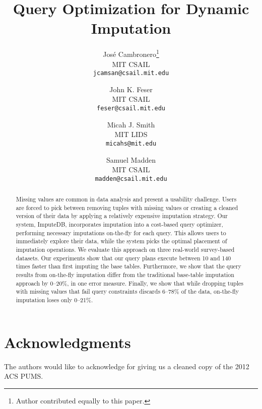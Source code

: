 \documentclass[preprint]{vldb}
\title{Query Optimization for Dynamic Imputation}
\author{
  Jos\'e Cambronero\thanks{Author contributed equally to this paper.} \\
  MIT CSAIL \\
  \texttt{jcamsan@csail.mit.edu}
  \and
  John K. Feser\footnotemark[1] \\
  MIT CSAIL \\
  \texttt{feser@csail.mit.edu}
  \and
  Micah J. Smith\footnotemark[1] \\
  MIT LIDS \\
  \texttt{micahs@mit.edu}
  \and
  Samuel Madden \\
  MIT CSAIL \\
  \texttt{madden@csail.mit.edu}}
\newcommand{\ProjectName}{ImputeDB\xspace}
\newcommand{\lowxalphazero}{10} %
\newcommand{\highxalphazeroexacs}{140} %
\newcommand{\lowsmapealphazero}{0} %
\newcommand{\highsmapealphaoneexacs}{20} %
\begin{document}
\maketitle

\begin{abstract}
  Missing values are common in data analysis and present a usability challenge.
  Users are forced to pick between removing tuples with missing values or creating a cleaned version of their data by applying a relatively expensive imputation strategy.
  Our system, \ProjectName{}, incorporates imputation into a cost-based query optimizer, performing necessary imputations on-the-fly for each query.
  This allows users to immediately explore their data, while the system picks the optimal placement of imputation operations.
  We evaluate this approach on three real-world survey-based datasets.
  Our experiments show that our query plans execute between \lowxalphazero{} and \highxalphazeroexacs{} times faster than first imputing the base tables.
  Furthermore, we show that the query results from on-the-fly imputation differ from the
  traditional base-table imputation approach by \lowsmapealphazero{}--\highsmapealphaoneexacs{}\%, in one error measure.
  Finally, we show that while dropping tuples with missing values that fail query constraints discards 6--78\% of the data, on-the-fly imputation loses only 0--21\%.
\end{abstract}









\section{Acknowledgments}
The authors would like to acknowledge \citeauthor{akande2015empirical} for giving us a cleaned copy of the 2012 ACS PUMS.

\balance
\printbibliography
\end{document}
